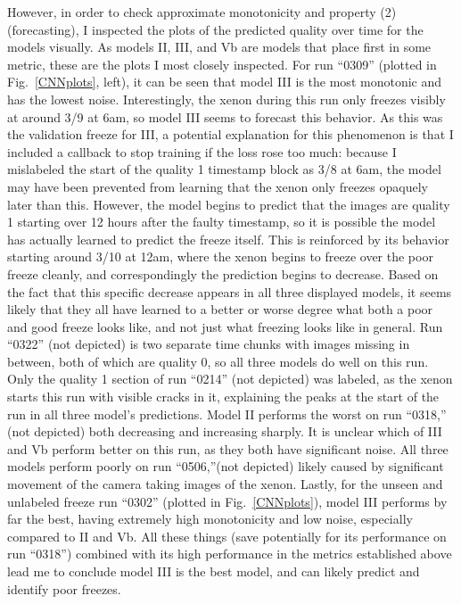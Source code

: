 \documentclass{article}
\begin{document}
However, in order to check approximate monotonicity and property (2) (forecasting), I inspected the plots of the predicted quality over time for the models visually. As models II, III, and Vb are models that place first in some metric, these are the plots I most closely inspected.  For run ``0309'' (plotted in Fig.~\ref{CNNplots}, left), it can be seen that model III is the most monotonic and has the lowest noise. Interestingly, the xenon during this run only freezes visibly at around 3/9 at 6am, so model III seems to forecast this behavior. As this was the validation freeze for III, a potential explanation for this phenomenon is that I included a callback to stop training if the loss rose too much: because I mislabeled the start of the quality 1 timestamp block as 3/8 at 6am, the model may have been prevented from learning that the xenon only freezes opaquely later than this. However, the model begins to predict that the images are quality 1 starting over 12 hours after the faulty timestamp, so it is possible the model has actually learned to predict the freeze itself. This is reinforced by its behavior starting around 3/10 at 12am, where the xenon begins to freeze over the poor freeze cleanly, and correspondingly the prediction begins to decrease. Based on the fact that this specific decrease appears in all three displayed models, it seems likely that they all have learned to a better or worse degree what both a poor and good freeze looks like, and not just what freezing looks like in general. Run ``0322'' (not depicted) is two separate time chunks with images missing in between, both of which are quality 0, so all three models do well on this run. Only the quality 1 section of run ``0214'' (not depicted) was labeled, as the xenon starts this run with visible cracks in it, explaining the peaks at the start of the run in all three model's predictions. Model II performs the worst on run ``0318,'' (not depicted) both decreasing and increasing sharply. It is unclear which of III and Vb perform better on this run, as they both have significant noise. All three models perform poorly on run ``0506,''(not depicted) likely caused by significant movement of the camera taking images of the xenon. Lastly, for the unseen and unlabeled freeze run ``0302'' (plotted in Fig.~\ref{CNNplots}), model III performs by far the best, having extremely high monotonicity and low noise, especially compared to II and Vb. All these things (save potentially for its performance on run ``0318'') combined with its high performance in the metrics established above lead me to conclude model III is the best model, and can likely predict and identify poor freezes.
\end{document}
